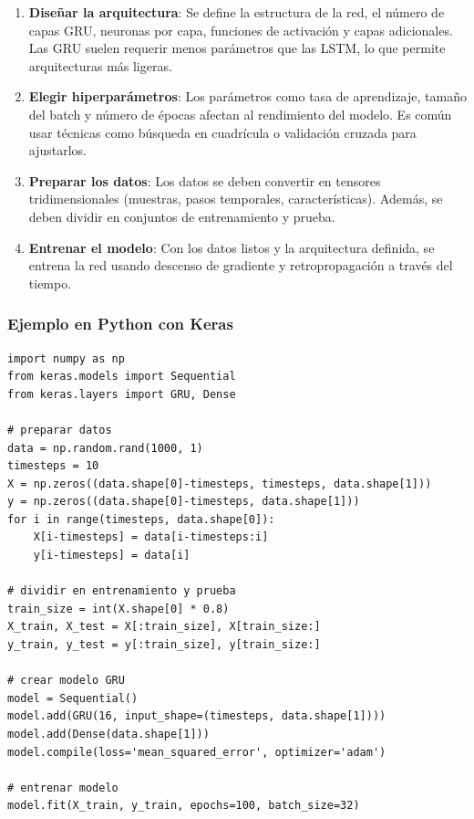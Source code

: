 \documentclass[11pt]{article}
\begin{document}
\begin{enumerate}
\item \textbf{\textbf{Diseñar la arquitectura}}: Se define la estructura de la red, el número de capas GRU, neuronas por capa, funciones de activación y capas adicionales. Las GRU suelen requerir menos parámetros que las LSTM, lo que permite arquitecturas más ligeras.

\item \textbf{\textbf{Elegir hiperparámetros}}: Los parámetros como tasa de aprendizaje, tamaño del batch y número de épocas afectan al rendimiento del modelo. Es común usar técnicas como búsqueda en cuadrícula o validación cruzada para ajustarlos.

\item \textbf{\textbf{Preparar los datos}}: Los datos se deben convertir en tensores tridimensionales (muestras, pasos temporales, características). Además, se deben dividir en conjuntos de entrenamiento y prueba.

\item \textbf{\textbf{Entrenar el modelo}}: Con los datos listos y la arquitectura definida, se entrena la red usando descenso de gradiente y retropropagación a través del tiempo.
\end{enumerate}

\subsubsection{Ejemplo en Python con Keras}
\label{sec:org89f79f3}
\begin{verbatim}
import numpy as np
from keras.models import Sequential
from keras.layers import GRU, Dense

# preparar datos
data = np.random.rand(1000, 1)
timesteps = 10
X = np.zeros((data.shape[0]-timesteps, timesteps, data.shape[1]))
y = np.zeros((data.shape[0]-timesteps, data.shape[1]))
for i in range(timesteps, data.shape[0]):
    X[i-timesteps] = data[i-timesteps:i]
    y[i-timesteps] = data[i]

# dividir en entrenamiento y prueba
train_size = int(X.shape[0] * 0.8)
X_train, X_test = X[:train_size], X[train_size:]
y_train, y_test = y[:train_size], y[train_size:]

# crear modelo GRU
model = Sequential()
model.add(GRU(16, input_shape=(timesteps, data.shape[1])))
model.add(Dense(data.shape[1]))
model.compile(loss='mean_squared_error', optimizer='adam')

# entrenar modelo
model.fit(X_train, y_train, epochs=100, batch_size=32)
\end{verbatim}
\end{document}
